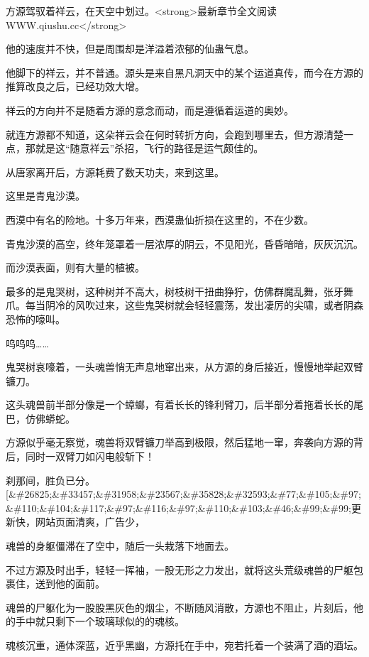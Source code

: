 
\begin{this_body}

方源驾驭着祥云，在天空中划过。<strong>最新章节全文阅读WWW.qiushu.cc</strong>

他的速度并不快，但是周围却是洋溢着浓郁的仙蛊气息。

他脚下的祥云，并不普通。源头是来自黑凡洞天中的某个运道真传，而今在方源的推算改良之后，已经功效大增。

祥云的方向并不是随着方源的意念而动，而是遵循着运道的奥妙。

就连方源都不知道，这朵祥云会在何时转折方向，会跑到哪里去，但方源清楚一点，那就是这“随意祥云”杀招，飞行的路径是运气颇佳的。

从唐家离开后，方源耗费了数天功夫，来到这里。

这里是青鬼沙漠。

西漠中有名的险地。十多万年来，西漠蛊仙折损在这里的，不在少数。

青鬼沙漠的高空，终年笼罩着一层浓厚的阴云，不见阳光，昏昏暗暗，灰灰沉沉。

而沙漠表面，则有大量的植被。

最多的是鬼哭树，这种树并不高大，树枝树干扭曲狰狞，仿佛群魔乱舞，张牙舞爪。每当阴冷的风吹过来，这些鬼哭树就会轻轻震荡，发出凄厉的尖啸，或者阴森恐怖的嚎叫。

呜呜呜……

鬼哭树哀嚎着，一头魂兽悄无声息地窜出来，从方源的身后接近，慢慢地举起双臂镰刀。

这头魂兽前半部分像是一个蟑螂，有着长长的锋利臂刀，后半部分着拖着长长的尾巴，仿佛蟒蛇。

方源似乎毫无察觉，魂兽将双臂镰刀举高到极限，然后猛地一窜，奔袭向方源的背后，同时一双臂刀如闪电般斩下！

刹那间，胜负已分。[\&\#26825;\&\#33457;\&\#31958;\&\#23567;\&\#35828;\&\#32593;\&\#77;\&\#105;\&\#97;\&\#110;\&\#104;\&\#117;\&\#97;\&\#116;\&\#97;\&\#110;\&\#103;\&\#46;\&\#99;\&\#99;更新快，网站页面清爽，广告少，

魂兽的身躯僵滞在了空中，随后一头栽落下地面去。

不过方源及时出手，轻轻一挥袖，一股无形之力发出，就将这头荒级魂兽的尸躯包裹住，送到他的面前。

魂兽的尸躯化为一股股黑灰色的烟尘，不断随风消散，方源也不阻止，片刻后，他的手中就只剩下一个玻璃球似的的魂核。

魂核沉重，通体深蓝，近乎黑幽，方源托在手中，宛若托着一个装满了酒的酒坛。


\end{this_body}
